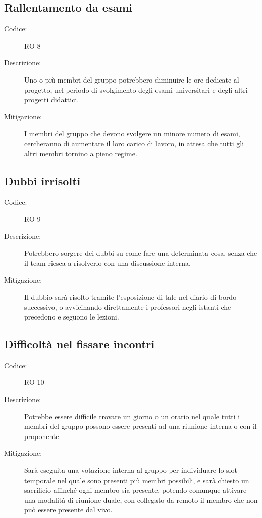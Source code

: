 \subsection*{Rallentamento da esami}
\begin{description}
    \item[Codice:] RO-8
    \item[Descrizione:] Uno o più membri del gruppo potrebbero diminuire le ore dedicate al progetto, nel periodo di svolgimento degli esami universitari e degli altri progetti didattici.
    \item[Mitigazione:] I membri del gruppo che devono svolgere un minore numero di esami, cercheranno di aumentare il loro carico di lavoro, in attesa che tutti gli altri membri tornino a pieno regime.
\end{description}

\subsection*{Dubbi irrisolti}
\begin{description}
    \item[Codice:] RO-9
    \item[Descrizione:] Potrebbero sorgere dei dubbi su come fare una determinata cosa, senza che il team riesca a risolverlo con una discussione interna.
    \item[Mitigazione:] Il dubbio sarà risolto tramite l'esposizione di tale nel diario di bordo successivo, o avvicinando direttamente i professori negli istanti che precedono e seguono le lezioni.
\end{description}

\subsection*{Difficoltà nel fissare incontri}
\begin{description}
    \item[Codice:] RO-10
    \item[Descrizione:] Potrebbe essere difficile trovare un giorno o un orario nel quale tutti i membri del gruppo possono essere presenti ad una riunione interna o con il proponente.
    \item[Mitigazione:] Sarà eseguita una votazione interna al gruppo per individuare lo slot temporale nel quale sono presenti più membri possibili, e sarà chiesto un sacrificio affinché ogni membro sia presente, potendo comunque attivare una modalità di riunione duale, con collegato da remoto il membro che non può essere presente dal vivo.
\end{description}


